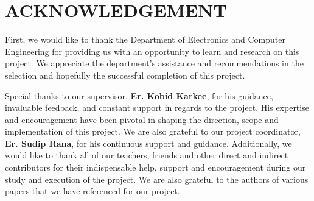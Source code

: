 \chapter*{ACKNOWLEDGEMENT}
{}

First, we would like to thank the Department of Electronics and Computer Engineering
for providing us with an opportunity to learn and research on this project. We appreciate
the department’s assistance and recommendations in the selection and hopefully the
successful completion of this project.

Special thanks to our supervisor, \textbf{Er. Kobid Karkee}, for his guidance, invaluable
feedback, and constant support in regards to the project. His expertise and
encouragement have been pivotal in shaping the direction, scope and implementation
of this project. We are also grateful to our project coordinator, \textbf{Er. Sudip Rana}, for his
continuous support and guidance.
Additionally, we would like to thank all of our teachers, friends and other direct and
indirect contributors for their indispensable help, support and encouragement during
our study and execution of the project. We are also grateful to the authors of various
papers that we have referenced for our project.

\vspace{1em}
\noindent \authorTable